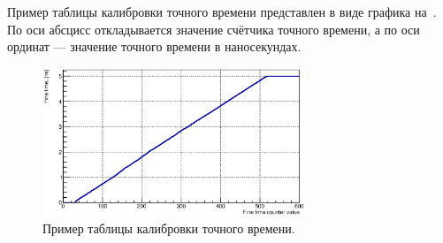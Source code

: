 Пример таблицы калибровки точного времени представлен в виде графика на~. По оси абсцисс откладывается значение счётчика точного времени, а по оси ординат --- значение точного времени в наносекундах.


\begin{figure}[H]
\centering
\includegraphics[width=0.7\textwidth]{pictures/CalTable_0010_01.eps}
\caption{Пример таблицы калибровки точного времени.}
\label{fig:CalibTable}
\end{figure}
